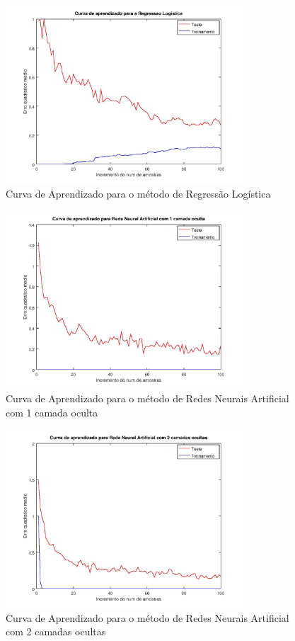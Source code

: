 \documentclass[10pt, conference, compsocconf]{IEEEtran}
\begin{document}
\begin{figure}[!t]
\centering
\includegraphics[width=3.5in]{imgs/RLcurve.jpg}
\caption{Curva de Aprendizado para o método de Regressão Logística}
\label{fig:rl_curve}
\end{figure}

\begin{figure}[!t]
\centering
\includegraphics[width=3.5in]{imgs/RN1Curve.jpg}
\caption{Curva de Aprendizado para o método de Redes Neurais Artificial com 1 camada oculta}
\label{fig:rn1_curve}
\end{figure}

\begin{figure}[!t]
\centering
\includegraphics[width=3.5in]{imgs/RN2Curve.jpg}
\caption{Curva de Aprendizado para o método de Redes Neurais Artificial com 2 camadas ocultas}
\label{fig:rn2_curve}
\end{figure}
\end{document}
